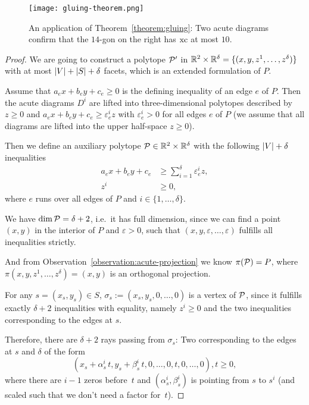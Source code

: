 \begin{figure}[ht]
  \centering
  \texttt{[image: gluing-theorem.png]}
  \caption{An application of Theorem~\ref{theorem:gluing}: Two acute diagrams confirm that the $14$-gon on the right has $\xc$ at most $10$. \cite[Figure 3]{shitov2020sublinear}}
  \label{fig:gluing-theorem}
\end{figure}

\begin{proof}
  We are going to construct a polytope $\P'$ in $\R^2 \times \R^{\delta} = \{(x,y,z^1,\dots,z^{\delta})\}$ with at most $\abs{V}+\abs{S}+\delta$ facets, which is an extended formulation of $P$.

  Assume that $a_e x + b_e y + c_e \geq 0$ is the defining inequality of an edge $e$ of $P$. Then the acute diagrams $D^i$ are lifted into three-dimensional polytopes described by $z \geq 0$ and $a_e x + b_e y + c_e \geq \varepsilon_e^i z$ with $\varepsilon_e^i > 0$ for all edges $e$ of $P$ (we assume that all diagrams are lifted into the upper half-space $z \geq 0$).

  Then we define an auxiliary polytope $\P \in \R^2 \times \R^{\delta}$ with the following $\abs{V}+\delta$ inequalities
  \begin{align*}
    a_e x + b_e y + c_e & \geq \sum_{i=1}^{\delta} \varepsilon_e^i z, \\
    z^i                 & \geq 0,
  \end{align*}
  where $e$ runs over all edges of $P$ and $i \in \{1,\dots,\delta\}$.

  We have $\dim \P = \delta + 2$, i.e.\ it has full dimension, since we can find a point $(x,y)$ in the interior of $P$ and $\varepsilon > 0$, such that $(x,y,\varepsilon,\dots,\varepsilon)$ fulfills all inequalities strictly.

  And from Observation~\ref{observation:acute-projection} we know $\pi(\P)=P$, where $\pi(x,y,z^1,\dots,z^{\delta}) = (x,y)$ is an orthogonal projection.

  For any $s = (x_s, y_s) \in S$, $\sigma_s := (x_s,y_s,0,\dots,0)$ is a vertex of $\P$, since it fulfills exactly $\delta + 2$ inequalities with equality, namely $z^i \geq 0$ and the two inequalities corresponding to the edges at $s$.

  Therefore, there are $\delta + 2$ rays passing from $\sigma_s$: Two corresponding to the edges at $s$ and $\delta$ of the form
  \begin{equation}\label{eq:ray}
    (x_s + \alpha_s^i\,t,y_s + \beta_s^i\,t,0,\dots,0,t,0,\dots,0), t \geq 0,
  \end{equation}
  where there are $i-1$ zeros before~$t$ and $(\alpha_s^i, \beta_s^i)$ is pointing from $s$ to $s^i$ (and scaled such that we don't need a factor for~$t$).


\end{proof}
